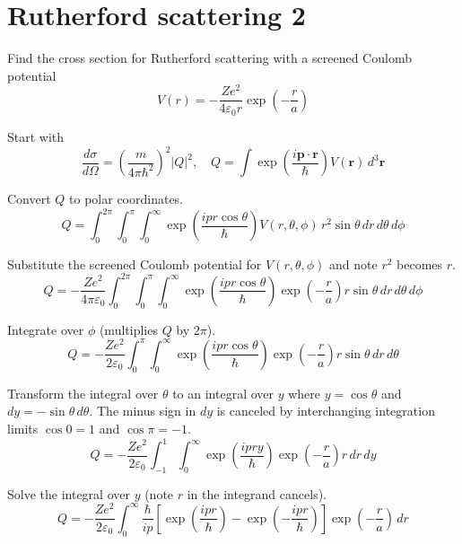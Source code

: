 

\section*{Rutherford scattering 2}

Find the cross section for Rutherford scattering with a screened Coulomb potential
\begin{equation*}
V(r)=-\frac{Ze^2}{4\varepsilon_0r}\exp\left(-\frac{r}{a}\right)
\end{equation*}

Start with
\begin{equation*}
\frac{d\sigma}{d\Omega}=
\left(\frac{m}{4\pi\hbar^2}\right)^2|Q|^2,\quad
Q=\int\exp\left(\frac{i\mathbf p\cdot\mathbf r}{\hbar}\right)V(\mathbf r)\,d^3\mathbf r
\end{equation*}

Convert $Q$ to polar coordinates.
\begin{equation*}
Q=\int_0^{2\pi}
\int_0^\pi
\int_0^\infty
\exp\left(\frac{ipr\cos\theta}{\hbar}\right)V(r,\theta,\phi)
\,r^2\sin\theta\,dr\,d\theta\,d\phi
\end{equation*}

Substitute the screened Coulomb potential for $V(r,\theta,\phi)$ and note $r^2$ becomes $r$.
\begin{equation*}
Q=-\frac{Ze^2}{4\pi\varepsilon_0}
\int_0^{2\pi}
\int_0^\pi
\int_0^\infty
\exp\left(\frac{ipr\cos\theta}{\hbar}\right)
\exp\left(-\frac{r}{a}\right)
r\sin\theta\,dr\,d\theta\,d\phi
\end{equation*}

Integrate over $\phi$ (multiplies $Q$ by $2\pi$).
\begin{equation*}
Q=-\frac{Ze^2}{2\varepsilon_0}
\int_0^\pi
\int_0^\infty
\exp\left(\frac{ipr\cos\theta}{\hbar}\right)
\exp\left(-\frac{r}{a}\right)
r\sin\theta\,dr\,d\theta
\end{equation*}

Transform the integral over $\theta$ to an integral over $y$
where $y=\cos\theta$ and $dy=-\sin\theta\,d\theta$.
The minus sign in $dy$ is canceled by interchanging integration limits
$\cos0=1$ and $\cos\pi=-1$.
\begin{equation*}
Q=-\frac{Ze^2}{2\varepsilon_0}
\int_{-1}^1
\int_0^\infty
\exp\left(\frac{ipry}{\hbar}\right)
\exp\left(-\frac{r}{a}\right)
r\,dr\,dy
\end{equation*}

Solve the integral over $y$ (note $r$ in the integrand cancels).
\begin{equation*}
Q=-\frac{Ze^2}{2\varepsilon_0}
\int_0^\infty
\frac{\hbar}{ip}
\left[\exp\left(\frac{ipr}{\hbar}\right)-\exp\left(-\frac{ipr}{\hbar}\right)\right]
\exp\left(-\frac{r}{a}\right)
\,dr
\end{equation*}

